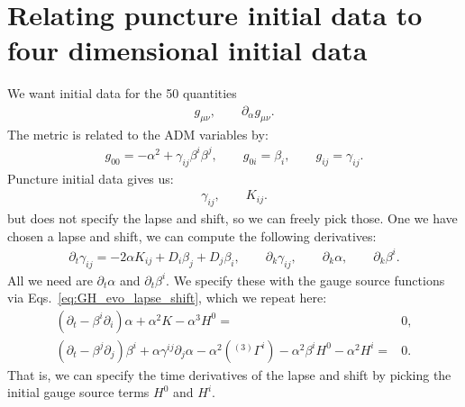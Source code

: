 \documentclass[%
notitlepage,
report,
nofootinbib,
 amsmath,amssymb,
 aps,
]{revtex4-1}
\begin{document}
\section{Relating puncture initial data to four dimensional initial data}
We want initial data for the 50 quantities
\begin{align}
   g_{\mu\nu},\qquad\partial_{\alpha}g_{\mu\nu}
   .
\end{align}
The metric is related to the ADM variables by:
\begin{subequations}
\begin{align}
   g_{00}
   =
   -  
   \alpha^2
   +
   \gamma_{ij}\beta^i\beta^j
   ,\qquad
   g_{0i}
   =
   \beta_i
   ,\qquad
   g_{ij}
   =
   \gamma_{ij}
   .
\end{align}
\end{subequations}
Puncture initial data gives us:
\begin{align}
   \gamma_{ij},\qquad K_{ij}
   .
\end{align}
but does not specify the lapse and shift, so we can freely pick those.
One we have chosen a lapse and shift, we can compute the following derivatives:
\begin{subequations}
\begin{align}
   \partial_t\gamma_{ij}
   =
   -
   2\alpha K_{ij}
   +
   D_i\beta_j
   +
   D_j\beta_i
   ,\qquad
   \partial_k\gamma_{ij}
   ,\qquad
   \partial_k\alpha
   ,\qquad
   \partial_k\beta^i
   .
\end{align}
\end{subequations}
All we need are $\partial_t\alpha$ and $\partial_t\beta^i$.
We specify these with the gauge source functions via
Eqs.~\eqref{eq:GH_evo_lapse_shift}, which we repeat here:
\begin{subequations}
\begin{align}
   \left(
      \partial_t
   -  \beta^i\partial_i
   \right)
   \alpha
   +  \alpha^2K
   -  \alpha^3H^0
   =&
   0
   ,\\
   \left(
      \partial_t
   -  \beta^j\partial_j
   \right)
   \beta^i
+  \alpha\gamma^{ij}\partial_j\alpha
-  \alpha^2\left({}^{(3)}\Gamma^i\right)
-  \alpha^2\beta^iH^0
-  \alpha^2H^i
   =&
   0
   .
\end{align}   
\end{subequations}
That is, we can specify the time derivatives of the lapse and shift
by picking the initial gauge source terms $H^0$ and $H^i$.

\appendix
\end{document}
